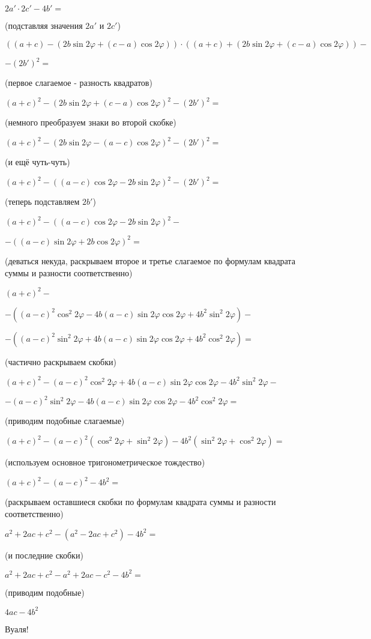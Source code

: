 \documentclass[a4paper,11pt]{article}
\begin{document}

$ 2a' \cdot 2c' - 4b' = $

(подставляя значения $2a'$ и $2c'$)

$ ((a+c)-(2b \sin 2 \varphi + (c-a) \cos 2 \varphi))
\cdot
((a+c)+(2b \sin 2 \varphi + (c-a) \cos 2 \varphi))-$

$-(2b')^2 = $

(первое слагаемое - разность квадратов)

$ (a+c)^2-(2b \sin 2 \varphi + (c-a) \cos 2 \varphi)^2 - (2b')^2 = $

(немного преобразуем знаки во второй скобке)

$(a+c)^2-(2b \sin 2 \varphi - (a-c) \cos 2 \varphi)^2 - (2b')^2 =
$

(и ещё чуть-чуть)

$(a+c)^2-((a-c) \cos 2 \varphi - 2b \sin 2 \varphi)^2 -(2b')^2 =
$

(теперь подставляем $2b'$)

$(a+c)^2-((a-c) \cos 2 \varphi - 2b \sin 2 \varphi)^2 - $

$-((a-c) \sin 2 \varphi + 2b \cos 2 \varphi)^2 =
$

(деваться некуда, раскрываем второе и третье слагаемое по формулам квадрата суммы и разности соответственно)

$
(a+c)^2-
$

$
-(
(a-c)^2 \cos ^2 2 \varphi
- 4 b (a-c) \sin 2 \varphi \cos 2 \varphi
+ 4b^2 \sin ^2 2 \varphi
)-
$

$
-(
(a-c)^2 \sin ^2 2 \varphi
+ 4 b (a-c) \sin 2 \varphi \cos 2 \varphi
+ 4b^2 \cos ^2 2 \varphi
)=
$

(частично раскрываем скобки)

$(a+c)^2
-(a-c)^2 \cos ^2 2 \varphi
+ 4 b (a-c) \sin 2 \varphi \cos 2 \varphi
- 4b^2 \sin ^2 2 \varphi -$

$-(a-c)^2 \sin ^2 2 \varphi
- 4 b (a-c) \sin 2 \varphi \cos 2 \varphi
- 4b^2 \cos ^2 2 \varphi
=$

(приводим подобные слагаемые)

$(a+c)^2
-(a-c)^2 (\cos ^2 2 \varphi + \sin ^2 2 \varphi)
- 4b^2 (\sin ^2 2 \varphi + \cos ^2 2 \varphi)
=$

(используем основное тригонометрическое тождество)

$(a+c)^2 - (a-c)^2 - 4b^2 =$

(раскрываем оставшиеся скобки по формулам квадрата суммы и разности соответственно)

$a^2 + 2ac + c^2 - (a^2 - 2ac + c^2) - 4b^2 =$

(и последние скобки)

$a^2 + 2ac + c^2 - a^2 + 2ac - c^2 - 4b^2 =$

(приводим подобные)

$4ac - 4b^2 $

Вуаля!
\end{document}
